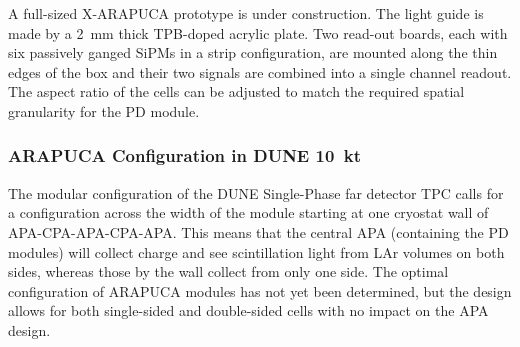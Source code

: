  A full-sized X-ARAPUCA prototype is under construction. The light guide is made by a \SI{2}{mm} thick TPB-doped acrylic plate. Two read-out boards, each with six passively ganged SiPMs in a strip configuration, are mounted along the thin edges of the box and their two signals are combined into a single channel readout. 
 The aspect ratio of the cells can be adjusted to match the required spatial granularity for the PD module.
 
%
 
\subsubsection{ARAPUCA Configuration in DUNE 10~kt} 
\label{sssec:arapuca-dune}
The modular configuration of the DUNE Single-Phase far detector TPC calls for a configuration across the width of the module starting at one cryostat wall of APA-CPA-APA-CPA-APA. This means that the central APA (containing the PD modules) will collect charge and see scintillation light from LAr volumes on both sides, whereas those by the wall collect from only one side. The optimal configuration of ARAPUCA modules has not yet been determined, but the design allows for both single-sided and double-sided cells with no impact on the APA design. 


